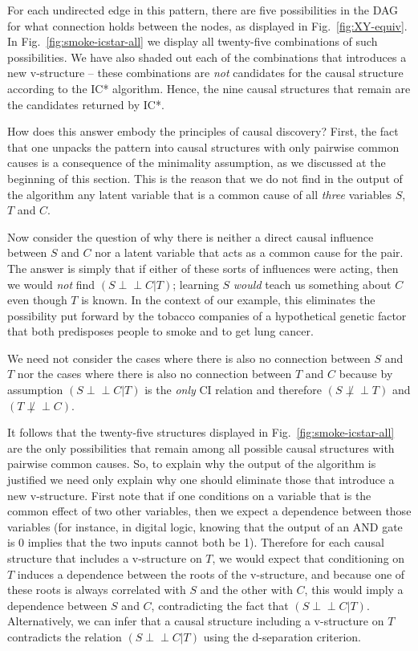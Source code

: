\documentclass[12pt,onecolumn,nofootinbib]{revtex4-2}
\def\indep{\perp\!\!\!\!\perp}
\begin{document}
For each undirected edge in this pattern, there are five possibilities in the DAG for what connection holds between the nodes, as displayed in Fig.~\ref{fig:XY-equiv}. In Fig.~\ref{fig:smoke-icstar-all} we display all twenty-five combinations of such possibilities.  We have also shaded out each of the combinations that introduces a new v-structure -- these combinations are \emph{not} candidates for the causal structure according to the IC* algorithm.  Hence, the nine causal structures that remain are the candidates returned by IC*.

How does this answer embody the principles of causal discovery?  
First, the fact that one unpacks the pattern into causal structures with only pairwise common causes is a consequence of the minimality assumption, 
as we discussed at the beginning of this section.  This is the reason that we do not find in the output of the algorithm any latent variable that is a common cause of all \emph{three} variables $S$, $T$ and $C$.

Now consider the question of why there is neither a direct causal influence between $S$ and $C$ nor a latent variable that acts as a common cause for the pair.  The  answer is simply that if either of these sorts of influences were acting, then we would \emph{not} find $(S \indep C |T)$; learning $S$ \emph{would} teach us something about $C$ even though $T$ is known. In the context of our example, this eliminates the possibility put forward by the tobacco companies of a hypothetical genetic factor that both predisposes people to smoke and to get lung cancer.

We need not consider the cases where there is also no connection between $S$ and $T$ nor the cases where there is also no connection between $T$ and $C$ because by assumption $(S \indep C|T)$ is the \emph{only} CI relation and therefore $(S \not\indep T)$ and $(T \not\indep C)$.

It follows that the twenty-five structures displayed in Fig.~\ref{fig:smoke-icstar-all} are the only possibilities that remain among all possible causal structures with pairwise common causes.  So, to explain why the output of the algorithm is justified we need only explain why one should eliminate those that introduce a new v-structure.
First note that if one conditions on a variable that is the common effect of two other variables, then we expect a dependence between those variables (for instance, in digital logic, knowing that the output of an AND gate is 0 implies that the two inputs cannot both be 1). Therefore for each causal structure that includes a v-structure on $T$, we would expect that conditioning on $T$ induces a dependence between the roots of the v-structure, and because one of these roots is always correlated with $S$ and the other with $C$, this would imply a dependence between $S$ and $C$, contradicting the fact that $(S \indep C|T)$.  Alternatively, we can infer that a causal structure including a v-structure on $T$ contradicts the relation $(S \indep C|T)$ using the d-separation criterion.
\end{document}
